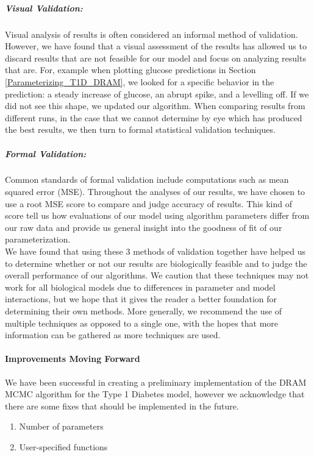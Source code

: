\subparagraph{Visual Validation:} Visual analysis of results is often considered an informal method of validation. However, we have found that a visual assessment of the results has allowed us to discard results that are not feasible for our model and focus on analyzing results that are. For, example when plotting glucose predictions in Section \ref{Parameterizing_T1D_DRAM},  we looked for a specific behavior in the prediction: a steady increase of glucose, an abrupt spike, and a levelling off. If we did not see this shape, we updated our algorithm. When comparing results from different runs, in the case that we cannot determine by eye which has produced the best results, we then turn to formal statistical validation techniques.

\subparagraph{Formal Validation:} Common standards of formal validation include computations such as mean squared error (MSE). Throughout the analyses of our results, we have chosen to use a root MSE score to compare and judge accuracy of results. This kind of score tell us how evaluations of our model using algorithm parameters differ from our raw data and provide us general insight into the goodness of fit of our parameterization. \vspace{3 mm} \\

We have found that using these 3 methods of validation together have helped us to determine whether or not our results are biologically feasible and to judge the overall performance of our algorithms. We caution that these techniques may not work for all biological models due to differences in parameter and model interactions, but we hope that it gives the reader a better foundation for determining their own methods. More generally, we recommend the use of multiple techniques as opposed to a single one, with the hopes that more information can be gathered as more techniques are used.
\paragraph{Improvements Moving Forward}
We have been successful in creating a preliminary implementation of the DRAM MCMC algorithm for the Type 1 Diabetes model, however we acknowledge that there are some fixes that should be implemented in the future.
\begin{enumerate}
    \item Number of parameters
    \item User-specified functions
\end{enumerate}

